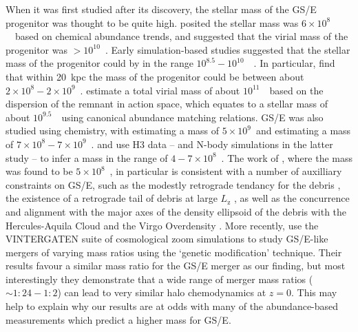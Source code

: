 When it was first studied after its discovery, the stellar mass of the GS/E progenitor was thought to be quite high. \textcite{helmi18} posited the stellar mass was $6\times10^{8}$~\Msun\ based on chemical abundance trends, and \textcite{belokurov18} suggested that the virial mass of the progenitor was $> 10^{10}$~\Msun. Early simulation-based studies suggested that the stellar mass of the progenitor could by in the range $10^{8.5}-10^{10}$~\Msun\ \parencite{fattahi19,mackereth19a}.  In particular, \textcite{fattahi19} find that within 20~kpc the mass of the progenitor could be between about $2\times10^{8} - 2\times10^{9}$~\Msun. \textcite{das20} estimate a total virial mass of about $10^{11}$~\Msun\ based on the dispersion of the remnant in action space, which equates to a stellar mass of about $10^{9.5}$~\Msun\ using canonical abundance matching relations. GS/E was also studied using chemistry, with \textcite{vincenzo19} estimating a mass of $5\times10^{9}$\Msun\ and \textcite{feuillet20} estimating a mass of $7\times10^{8} - 7\times10^{9}$~\Msun. \textcite{naidu20} and \textcite{naidu21} use H3 data -- and N-body simulations in the latter study -- to infer a mass in the range of $4-7\times10^{8}$~\Msun. The work of \textcite{naidu21}, where the mass was found to be $5\times10^{8}$~\Msun, in particular is consistent with a number of auxilliary constraints on GS/E, such as the modestly retrograde tendancy for the debris \parencite{belokurov18,helmi18}, the existence of a retrograde tail of debris at large $L_\mathrm{z}$ \parencite{helmi18,naidu20}, as well as the concurrence and alignment with the major axes of the density ellipsoid of the debris with the Hercules-Aquila Cloud and the Virgo Overdensity \parencite[first noted by][]{simion19}. More recently, \textcite{rey23} use the VINTERGATEN suite of cosmological zoom simulations to study GS/E-like mergers of varying mass ratios using the `genetic modification' technique. Their results favour a similar mass ratio for the GS/E merger as our finding, but most interestingly they demonstrate that a wide range of merger mass ratios ($\sim 1:24 - 1:2$) can lead to very similar halo chemodynamics at $z=0$. This may help to explain why our results are at odds with many of the abundance-based measurements which predict a higher mass for GS/E.

